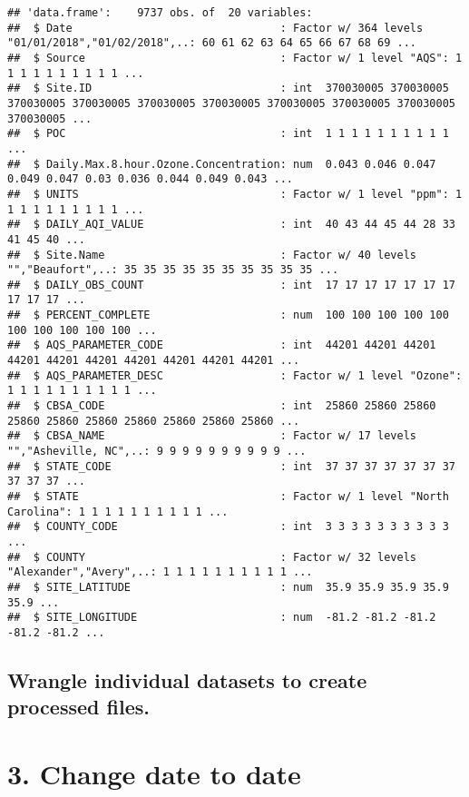 \documentclass[
]{article}
\begin{document}
\begin{verbatim}
## 'data.frame':    9737 obs. of  20 variables:
##  $ Date                                : Factor w/ 364 levels "01/01/2018","01/02/2018",..: 60 61 62 63 64 65 66 67 68 69 ...
##  $ Source                              : Factor w/ 1 level "AQS": 1 1 1 1 1 1 1 1 1 1 ...
##  $ Site.ID                             : int  370030005 370030005 370030005 370030005 370030005 370030005 370030005 370030005 370030005 370030005 ...
##  $ POC                                 : int  1 1 1 1 1 1 1 1 1 1 ...
##  $ Daily.Max.8.hour.Ozone.Concentration: num  0.043 0.046 0.047 0.049 0.047 0.03 0.036 0.044 0.049 0.043 ...
##  $ UNITS                               : Factor w/ 1 level "ppm": 1 1 1 1 1 1 1 1 1 1 ...
##  $ DAILY_AQI_VALUE                     : int  40 43 44 45 44 28 33 41 45 40 ...
##  $ Site.Name                           : Factor w/ 40 levels "","Beaufort",..: 35 35 35 35 35 35 35 35 35 35 ...
##  $ DAILY_OBS_COUNT                     : int  17 17 17 17 17 17 17 17 17 17 ...
##  $ PERCENT_COMPLETE                    : num  100 100 100 100 100 100 100 100 100 100 ...
##  $ AQS_PARAMETER_CODE                  : int  44201 44201 44201 44201 44201 44201 44201 44201 44201 44201 ...
##  $ AQS_PARAMETER_DESC                  : Factor w/ 1 level "Ozone": 1 1 1 1 1 1 1 1 1 1 ...
##  $ CBSA_CODE                           : int  25860 25860 25860 25860 25860 25860 25860 25860 25860 25860 ...
##  $ CBSA_NAME                           : Factor w/ 17 levels "","Asheville, NC",..: 9 9 9 9 9 9 9 9 9 9 ...
##  $ STATE_CODE                          : int  37 37 37 37 37 37 37 37 37 37 ...
##  $ STATE                               : Factor w/ 1 level "North Carolina": 1 1 1 1 1 1 1 1 1 1 ...
##  $ COUNTY_CODE                         : int  3 3 3 3 3 3 3 3 3 3 ...
##  $ COUNTY                              : Factor w/ 32 levels "Alexander","Avery",..: 1 1 1 1 1 1 1 1 1 1 ...
##  $ SITE_LATITUDE                       : num  35.9 35.9 35.9 35.9 35.9 ...
##  $ SITE_LONGITUDE                      : num  -81.2 -81.2 -81.2 -81.2 -81.2 ...
\end{verbatim}

\hypertarget{wrangle-individual-datasets-to-create-processed-files.}{%
\subsection{Wrangle individual datasets to create processed
files.}\label{wrangle-individual-datasets-to-create-processed-files.}}

\hypertarget{change-date-to-date}{%
\section{3. Change date to date}\label{change-date-to-date}}
\end{document}
